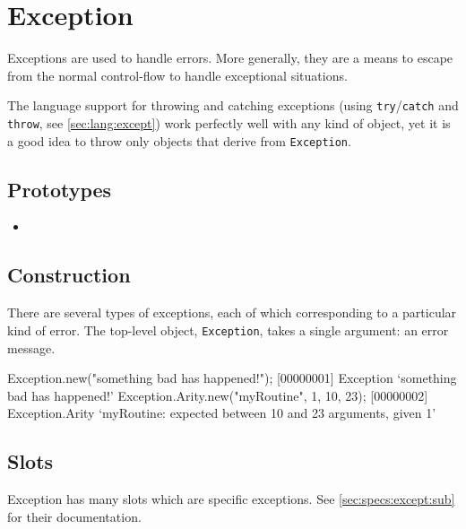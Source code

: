 
\section{Exception}

Exceptions are used to handle errors.  More generally, they are a
means to escape from the normal control-flow to handle exceptional
situations.

The language support for throwing and catching exceptions (using
\lstinline|try|/\lstinline|catch| and \lstinline|throw|, see
\autoref{sec:lang:except}) work perfectly well with any kind of
object, yet it is a good idea to throw only objects that derive from
\lstinline|Exception|.

\subsection{Prototypes}
\begin{itemize}
\item {}
\end{itemize}

\subsection{Construction}

There are several types of exceptions, each of which corresponding to
a particular kind of error.  The top-level object,
\lstinline|Exception|, takes a single argument: an error message.

\begin{urbiscript}[firstnumber=1]
Exception.new("something bad has happened!");
[00000001] Exception `something bad has happened!'
Exception.Arity.new("myRoutine", 1, 10, 23);
[00000002] Exception.Arity `myRoutine: expected between 10 and 23 arguments, given 1'
\end{urbiscript}


\subsection{Slots}

Exception has many slots which are specific exceptions.  See
\autoref{sec:specs:except:sub} for their documentation.

